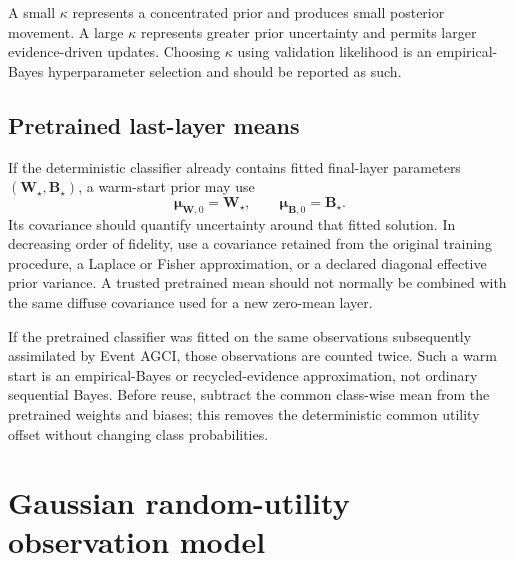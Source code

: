 \documentclass[11pt]{article}
\begin{document}
A small $\kappa$ represents a concentrated prior and produces small posterior
movement.  A large $\kappa$ represents greater prior uncertainty and permits
larger evidence-driven updates.  Choosing $\kappa$ using validation likelihood
is an empirical-Bayes hyperparameter selection and should be reported as such.

\subsection{Pretrained last-layer means}

If the deterministic classifier already contains fitted final-layer
parameters $(\bm W_\star,\bm B_\star)$, a warm-start prior may use
\begin{equation}
 \bm\mu_{\bm W,0}=\bm W_\star,
 \qquad
 \bm\mu_{\bm B,0}=\bm B_\star.
\end{equation}
Its covariance should quantify uncertainty around that fitted solution.  In
decreasing order of fidelity, use a covariance retained from the original
training procedure, a Laplace or Fisher approximation, or a declared diagonal
effective prior variance.  A trusted pretrained mean should not normally be
combined with the same diffuse covariance used for a new zero-mean layer.

If the pretrained classifier was fitted on the same observations subsequently
assimilated by Event AGCI, those observations are counted twice.  Such a warm
start is an empirical-Bayes or recycled-evidence approximation, not ordinary
sequential Bayes.  Before reuse, subtract the common class-wise mean from the
pretrained weights and biases; this removes the deterministic common utility
offset without changing class probabilities.

\section{Gaussian random-utility observation model}
\end{document}
